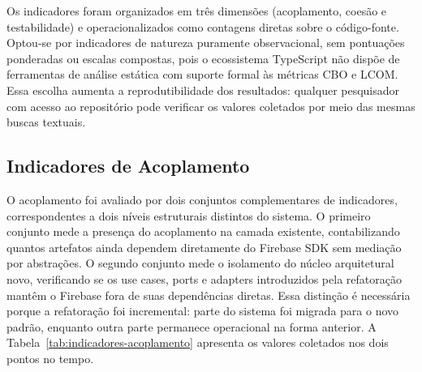 \documentclass[sigconf,anonymous]{acmart}
\begin{document}
Os indicadores foram organizados em três dimensões (acoplamento, coesão e testabilidade) e operacionalizados como contagens diretas sobre o código-fonte. Optou-se por indicadores de natureza puramente observacional, sem pontuações ponderadas ou escalas compostas, pois o ecossistema TypeScript não dispõe de ferramentas de análise estática com suporte formal às métricas CBO e LCOM. Essa escolha aumenta a reprodutibilidade dos resultados: qualquer pesquisador com acesso ao repositório pode verificar os valores coletados por meio das mesmas buscas textuais.

\subsection{Indicadores de Acoplamento}
\label{sec:indicadores-acoplamento}

O acoplamento foi avaliado por dois conjuntos complementares de indicadores, correspondentes a dois níveis estruturais distintos do sistema. O primeiro conjunto mede a presença do acoplamento na camada existente, contabilizando quantos artefatos ainda dependem diretamente do Firebase SDK sem mediação por abstrações. O segundo conjunto mede o isolamento do núcleo arquitetural novo, verificando se os use cases, ports e adapters introduzidos pela refatoração mantêm o Firebase fora de suas dependências diretas. Essa distinção é necessária porque a refatoração foi incremental: parte do sistema foi migrada para o novo padrão, enquanto outra parte permanece operacional na forma anterior. A Tabela~\ref{tab:indicadores-acoplamento} apresenta os valores coletados nos dois pontos no tempo.

\begin{table}[h]
  \caption{Indicadores de acoplamento coletados nos dois pontos no tempo}
  \label{tab:indicadores-acoplamento}
\end{table}
\end{document}
